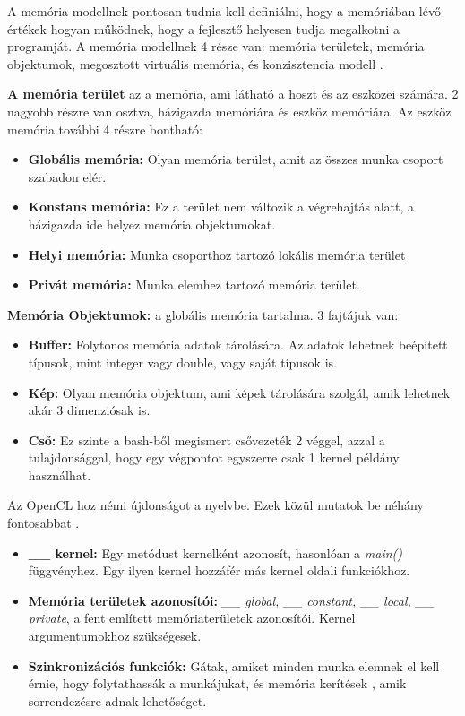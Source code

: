 A memória modellnek pontosan tudnia kell definiálni, hogy a memóriában lévő értékek hogyan működnek, hogy a fejlesztő helyesen tudja megalkotni a programját. A memória modellnek 4 része van: memória területek, memória objektumok, megosztott virtuális memória, és konzisztencia modell \cite{spec_mem}.

\textbf{A memória terület} az a memória, ami látható a hoszt és az eszközei számára. 2 nagyobb részre van osztva, házigazda memóriára és eszköz memóriára. Az eszköz memória további 4 részre bontható:
\begin{itemize}
\item\textbf{Globális memória:} Olyan memória terület, amit az összes munka csoport szabadon elér.
\item\textbf{Konstans memória:} Ez a terület nem változik a végrehajtás alatt, a házigazda ide helyez memória objektumokat.
\item\textbf{Helyi memória:} Munka csoporthoz tartozó lokális memória terület
\item\textbf{Privát memória:} Munka elemhez tartozó memória terület.
\end{itemize}
\textbf{Memória Objektumok:} a globális memória tartalma. 3 fajtájuk van:
\begin{itemize}
\item\textbf{Buffer:} Folytonos memória adatok tárolására. Az adatok lehetnek beépített típusok, mint integer vagy double, vagy saját típusok is.
\item\textbf{Kép:} Olyan memória objektum, ami képek tárolására szolgál, amik lehetnek akár 3 dimenziósak is.
\item\textbf{Cső:} Ez szinte a bash-ből megismert csővezeték 2 véggel, azzal a tulajdonsággal, hogy egy végpontot egyszerre csak 1 kernel példány használhat.
\end{itemize}

Az OpenCL hoz némi újdonságot a nyelvbe. Ezek közül mutatok be néhány fontosabbat \cite{opencl_c}.
\begin{itemize}
\item\textbf{\_\_ kernel:} Egy metódust kernelként azonosít, hasonlóan a \textit{main()} függvényhez. Egy ilyen kernel hozzáfér más kernel oldali funkciókhoz.
\item\textbf{Memória területek azonosítói:}\textit{ \_\_ global, \_\_ constant, \_\_ local, \_\_ private}, a fent említett memóriaterületek azonosítói. Kernel argumentumokhoz szükségesek.
\item\textbf{Szinkronizációs funkciók:} Gátak, amiket minden munka elemnek el kell érnie, hogy folytathassák a munkájukat, és memória kerítések \cite{fence}, amik sorrendezésre adnak lehetőséget.
\end{itemize}

